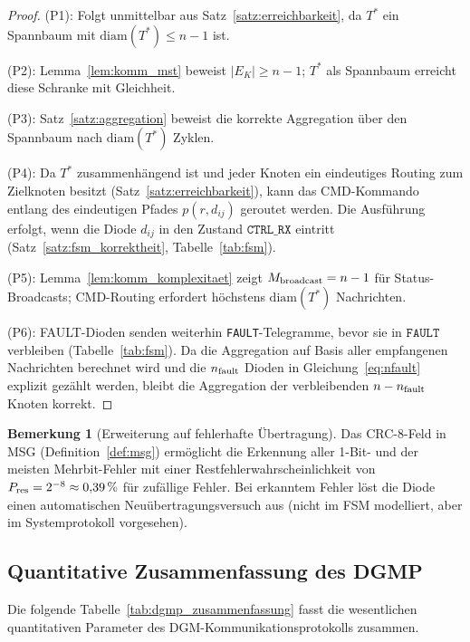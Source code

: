 ﻿\documentclass[a4paper,12pt]{article}
\theoremstyle{definition}
\newtheorem{bemerkung}[definition]{Bemerkung}
\theoremstyle{remark}
\begin{document}
\begin{proof}
(P1): Folgt unmittelbar aus Satz~\ref{satz:erreichbarkeit}, da $T^*$ ein
Spannbaum mit $\mathrm{diam}(T^*) \leq n-1$ ist.

(P2): Lemma~\ref{lem:komm_mst} beweist $|E_K| \geq n-1$; $T^*$ als Spannbaum
erreicht diese Schranke mit Gleichheit.

(P3): Satz~\ref{satz:aggregation} beweist die korrekte Aggregation über
den Spannbaum nach $\mathrm{diam}(T^*)$ Zyklen.

(P4): Da $T^*$ zusammenhängend ist und jeder Knoten ein eindeutiges Routing
zum Zielknoten besitzt (Satz~\ref{satz:erreichbarkeit}), kann das
CMD-Kommando entlang des eindeutigen Pfades $p(r, d_{ij})$ geroutet werden.
Die Ausführung erfolgt, wenn die Diode $d_{ij}$ in den Zustand
$\mathtt{CTRL\_RX}$ eintritt (Satz~\ref{satz:fsm_korrektheit},
Tabelle~\ref{tab:fsm}).

(P5): Lemma~\ref{lem:komm_komplexitaet} zeigt $M_{\rm broadcast} = n-1$
für Status-Broadcasts; CMD-Routing erfordert höchstens
$\mathrm{diam}(T^*)$ Nachrichten.

(P6): FAULT-Dioden senden weiterhin \texttt{FAULT}-Telegramme, bevor sie
in $\mathtt{FAULT}$ verbleiben (Tabelle~\ref{tab:fsm}). Da die Aggregation
auf Basis aller empfangenen Nachrichten berechnet wird und die
$n_{\rm fault}$ Dioden in Gleichung~\eqref{eq:nfault} explizit gezählt werden,
bleibt die Aggregation der verbleibenden $n - n_{\rm fault}$ Knoten korrekt.
\qedhere
\end{proof}

\begin{bemerkung}[Erweiterung auf fehlerhafte Übertragung]
\label{bem:fehler}
Das CRC-8-Feld in MSG (Definition~\ref{def:msg}) ermöglicht die Erkennung
aller 1-Bit- und der meisten Mehrbit-Fehler mit einer Restfehlerwahrscheinlichkeit
von $P_{\rm res} = 2^{-8} \approx 0{,}39\,\%$ für zufällige Fehler.
Bei erkanntem Fehler löst die Diode einen automatischen
Neuübertragungsversuch aus (nicht im FSM modelliert, aber im
Systemprotokoll vorgesehen).
\end{bemerkung}

\subsection{Quantitative Zusammenfassung des DGMP}

Die folgende Tabelle~\ref{tab:dgmp_zusammenfassung} fasst die wesentlichen
quantitativen Parameter des DGM-Kommu\-nikationsprotokolls zusammen.
\end{document}
